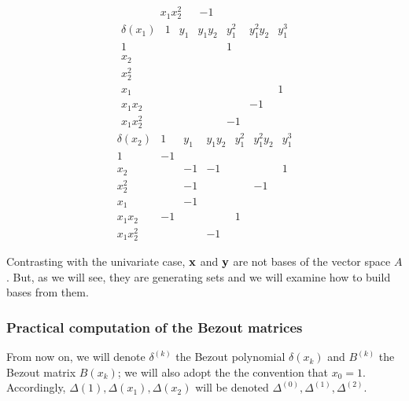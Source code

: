 \documentclass{standalone}
\begin{document}
\begin{exmp}
$$\begin{array}{c|cccccc}
	x_1x_2^2 &  & -1 &  &  &  &
\end{array}$$
$$\begin{array}{c|cccccc}
	\delta(x_1) & 1 & y_1 & y_1y_2 & y_1^2 & y_1^2y_2 & y_1^3 \\
	\hline
	1 &  &  &  & 1 &  & \\
	x_2 &  &  &  &  &  & \\
	x_2^2 &  &  &  &  &  & \\
	x_1 &  &  &  &  &  & 1\\
	x_1x_2 &  &  &  &  & -1 & \\
	x_1x_2^2 &  &  &  & -1 &  &
\end{array}$$
$$\begin{array}{c|cccccc}
	\delta(x_2) & 1 & y_1 & y_1y_2 & y_1^2 & y_1^2y_2 & y_1^3 \\
	\hline
	1 & -1 &  &  &  &  & \\
	x_2 &  & -1 & -1 &  &  & 1\\
	x_2^2 &  & -1 &  &  & -1 & \\
	x_1 &  & -1 &  &  &  & \\
	x_1x_2 & -1 &  &  & 1 &  & \\
	x_1x_2^2 &  &  & -1 &  &  &
\end{array}$$

\end{exmp}

\begin{rem}
Contrasting with the univariate case, $\bold{x}$ and $\bold{y}$ are not bases of the vector space $A$. 
But, as we will see, they are  generating sets and we will examine how to build bases from them.
\end{rem}

\subsubsection{Practical computation of the Bezout matrices}
From now on, we will denote $\delta^{(k)}$ the Bezout polynomial $\delta(x_k)$ and $B^{(k)}$ the Bezout matrix $B(x_k)$; we will also adopt the the convention that $x_0 = 1$. Accordingly, $\Delta(1), \Delta(x_1), \Delta(x_2)$ will be denoted $\Delta^{(0)}, \Delta^{(1)}, \Delta^{(2)}$.
\end{document}

